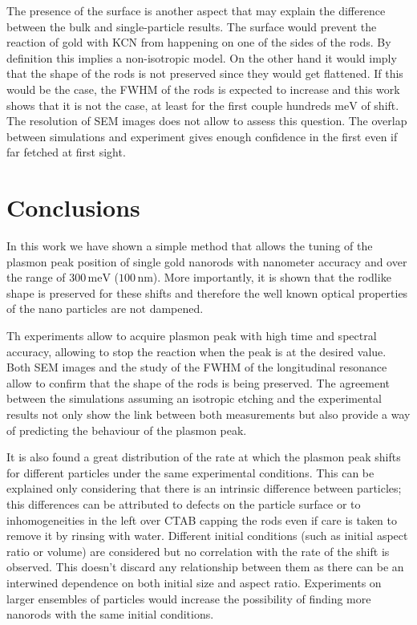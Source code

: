 \documentclass{article}
\begin{document}
The presence of the surface is another aspect that may explain the difference
between the bulk and single-particle results. The surface would prevent the
reaction of gold with KCN from happening on one of the sides of the rods. By
definition this implies a non-isotropic model. On the other hand it would imply
that the shape of the rods is not preserved since they would get flattened. If
this would be the case, the FWHM of the rods is expected to increase and this
work shows that it is not the case, at least for the first couple
hundreds $\textrm{meV}$ of shift. The resolution of SEM images does not allow to
assess this question. The overlap between simulations and experiment gives
enough confidence in the first even if far fetched at first sight.




\section{Conclusions}
In this work we have shown a simple method that allows the tuning of the plasmon
peak position of single gold nanorods with nanometer accuracy and over the range
of $300\,\textrm{meV}$ ($100\,\textrm{nm}$). More importantly, it is shown that
the rodlike shape is preserved for these shifts and therefore the well known
optical properties of the nano particles are not dampened. 

Th experiments allow to acquire plasmon peak with high time and spectral
accuracy, allowing to stop the reaction when the peak is at the desired value.
Both SEM images and the study of the FWHM of the longitudinal resonance allow to
confirm that the shape of the rods is being preserved. The agreement between the
simulations assuming an isotropic etching and the experimental results not only
show the link between both measurements but also provide a way of predicting the
behaviour of the plasmon peak. 

It is also found a great distribution of the rate at which the plasmon peak
shifts for different particles under the same experimental conditions. This can
be explained only considering that there is an intrinsic difference between
particles; this differences can be attributed to defects on the particle surface
or to inhomogeneities in the left over CTAB capping the rods even if care is
taken to remove it by rinsing with water. Different initial conditions (such as
initial aspect ratio or volume) are considered but no correlation with the rate
of the shift is observed. This doesn't discard any relationship between them as
there can be an interwined dependence on both initial size and aspect ratio.
Experiments on larger ensembles of particles would increase the possibility of
finding more nanorods with the same initial conditions. 
\end{document}
